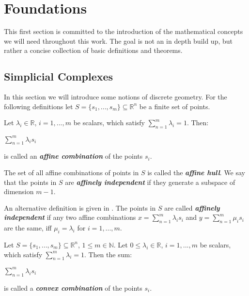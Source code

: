 \chapter{Foundations}

This first section is committed to the introduction of the mathematical concepts we will need throughout this work. The goal is not an in depth build up, but rather a concise collection of basic definitions and theorems.

\section{Simplicial Complexes} \label{sec:Simplicial Complexes}
In this section we will introduce some notions of discrete geometry. For the following definitions let $S = \{s_1,...,s_m\} \subseteq \mathbb{R}^n$ be a finite set of points.

\begin{defi}
Let $\lambda_i \in \mathbb{R}$, $i = 1,...,m$ be scalars, which satisfy $\sum\limits_{n=1}^m \lambda_i = 1$. Then:
\begin{center}
$\sum\limits_{n=1}^m \lambda_i s_i$
\end{center}
is called an  \textit{\textbf{affine combination}} of the points $s_i$. \cite[Definition 2.11]{Polyhedral+and+Algebraic+Methods}
\end{defi}

\begin{defi}
The set of all affine combinations of points in $S$ is called the  \textit{\textbf{affine hull}}. We say that the points in $S$ are \textit{\textbf{affinely independent}}
if they generate a subspace of dimension $m-1$. \cite[Definition 2.11]{Polyhedral+and+Algebraic+Methods}
\end{defi}


An alternative definition is given in \cite[III.1, paragraph 3]{Computational+Topology}. The points in $S$ are called  \textit{\textbf{affinely independent}}
if any two affine combinations $x = \sum\limits_{n=1}^m \lambda_i s_i$ and $y = \sum\limits_{n=1}^m \mu_i s_i$ are the same, iff $\mu_i = \lambda_i$ for $i = 1,...,m$.


\begin{defi}
Let $S = \{s_1,...,s_m\} \subseteq \mathbb{R}^n$, $1 \leq m \in \mathbb{N}$. Let $0 \leq \lambda_i \in \mathbb{R}$, $i = 1,...,m$ be scalars, which satisfy $\sum\limits_{n=1}^m \lambda_i = 1$. Then the sum:
\begin{center}
$\sum\limits_{n=1}^m \lambda_i s_i$
\end{center}
is called a  \textit{\textbf{convex combination}} of the points $s_i$. \cite[Definition 2.12]{Polyhedral+and+Algebraic+Methods}
\end{defi}

